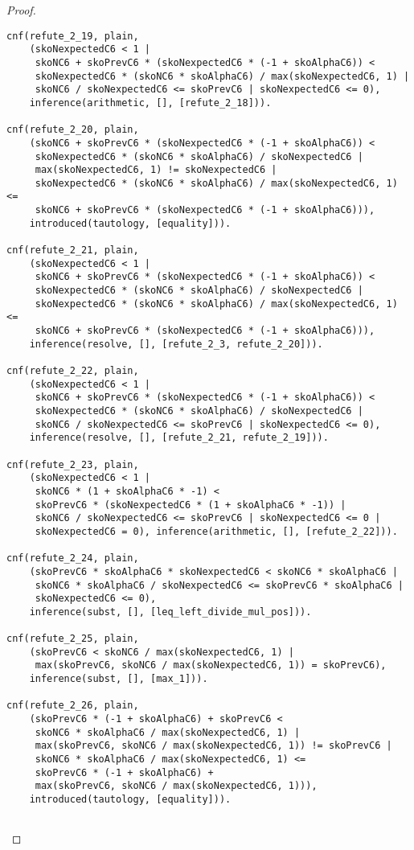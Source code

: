 \begin{proof}
\begin{verbatim}
cnf(refute_2_19, plain,
    (skoNexpectedC6 < 1 |
     skoNC6 + skoPrevC6 * (skoNexpectedC6 * (-1 + skoAlphaC6)) <
     skoNexpectedC6 * (skoNC6 * skoAlphaC6) / max(skoNexpectedC6, 1) |
     skoNC6 / skoNexpectedC6 <= skoPrevC6 | skoNexpectedC6 <= 0),
    inference(arithmetic, [], [refute_2_18])).

cnf(refute_2_20, plain,
    (skoNC6 + skoPrevC6 * (skoNexpectedC6 * (-1 + skoAlphaC6)) <
     skoNexpectedC6 * (skoNC6 * skoAlphaC6) / skoNexpectedC6 |
     max(skoNexpectedC6, 1) != skoNexpectedC6 |
     skoNexpectedC6 * (skoNC6 * skoAlphaC6) / max(skoNexpectedC6, 1) <=
     skoNC6 + skoPrevC6 * (skoNexpectedC6 * (-1 + skoAlphaC6))),
    introduced(tautology, [equality])).

cnf(refute_2_21, plain,
    (skoNexpectedC6 < 1 |
     skoNC6 + skoPrevC6 * (skoNexpectedC6 * (-1 + skoAlphaC6)) <
     skoNexpectedC6 * (skoNC6 * skoAlphaC6) / skoNexpectedC6 |
     skoNexpectedC6 * (skoNC6 * skoAlphaC6) / max(skoNexpectedC6, 1) <=
     skoNC6 + skoPrevC6 * (skoNexpectedC6 * (-1 + skoAlphaC6))),
    inference(resolve, [], [refute_2_3, refute_2_20])).

cnf(refute_2_22, plain,
    (skoNexpectedC6 < 1 |
     skoNC6 + skoPrevC6 * (skoNexpectedC6 * (-1 + skoAlphaC6)) <
     skoNexpectedC6 * (skoNC6 * skoAlphaC6) / skoNexpectedC6 |
     skoNC6 / skoNexpectedC6 <= skoPrevC6 | skoNexpectedC6 <= 0),
    inference(resolve, [], [refute_2_21, refute_2_19])).

cnf(refute_2_23, plain,
    (skoNexpectedC6 < 1 |
     skoNC6 * (1 + skoAlphaC6 * -1) <
     skoPrevC6 * (skoNexpectedC6 * (1 + skoAlphaC6 * -1)) |
     skoNC6 / skoNexpectedC6 <= skoPrevC6 | skoNexpectedC6 <= 0 |
     skoNexpectedC6 = 0), inference(arithmetic, [], [refute_2_22])).

cnf(refute_2_24, plain,
    (skoPrevC6 * skoAlphaC6 * skoNexpectedC6 < skoNC6 * skoAlphaC6 |
     skoNC6 * skoAlphaC6 / skoNexpectedC6 <= skoPrevC6 * skoAlphaC6 |
     skoNexpectedC6 <= 0),
    inference(subst, [], [leq_left_divide_mul_pos])).

cnf(refute_2_25, plain,
    (skoPrevC6 < skoNC6 / max(skoNexpectedC6, 1) |
     max(skoPrevC6, skoNC6 / max(skoNexpectedC6, 1)) = skoPrevC6),
    inference(subst, [], [max_1])).

cnf(refute_2_26, plain,
    (skoPrevC6 * (-1 + skoAlphaC6) + skoPrevC6 <
     skoNC6 * skoAlphaC6 / max(skoNexpectedC6, 1) |
     max(skoPrevC6, skoNC6 / max(skoNexpectedC6, 1)) != skoPrevC6 |
     skoNC6 * skoAlphaC6 / max(skoNexpectedC6, 1) <=
     skoPrevC6 * (-1 + skoAlphaC6) +
     max(skoPrevC6, skoNC6 / max(skoNexpectedC6, 1))),
    introduced(tautology, [equality])).


\end{verbatim}
\end{proof}

